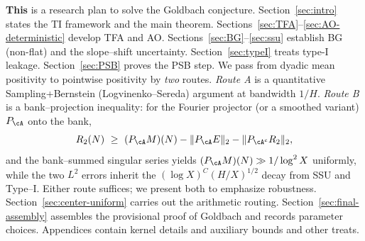 \noindent\textbf{This} is a research plan to solve the Goldbach conjecture.
Section~\ref{sec:intro} states the TI framework and the main theorem.
Sections~\ref{sec:TFA}--\ref{sec:AO-deterministic} develop TFA and AO.
Sections~\ref{sec:BG}--\ref{sec:ssu} establish BG (non-flat) and the slope--shift uncertainty.
Section~\ref{sec:typeI} treats type-I leakage. Section~\ref{sec:PSB} proves the PSB step.
We pass from dyadic mean positivity to pointwise positivity by \emph{two} routes.
\emph{Route A} is a quantitative Sampling+Bernstein (Logvinenko–Sereda) argument at bandwidth $1/H$.
\emph{Route B} is a bank–projection inequality: for the Fourier projector (or a smoothed variant) $P_{\cA}$ onto the bank,
\[
R_2(N)\ \ge\ (P_{\cA} M)(N) - \|P_{\cA}E\|_2 - \|P_{\cA^c}R_2\|_2,
\]
and the bank–summed singular series yields $(P_{\cA} M)(N)\gg 1/\log^2 X$ uniformly, while the two $L^2$ errors inherit the $ (\log X)^C(H/X)^{1/2}$ decay from SSU and Type–I.
Either route suffices; we present both to emphasize robustness.
Section~\ref{sec:center-uniform} carries out the arithmetic routing. Section~\ref{sec:final-assembly} assembles the provisional proof of Goldbach and records parameter choices. Appendices contain kernel details and auxiliary bounds and other treats.

